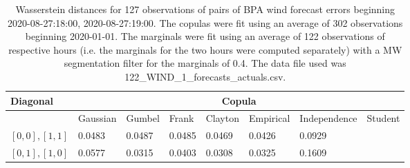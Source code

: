 \begin{table}[h] 
    \centering 
    \begin{tabular}{|l|l|l|l|l|l|l|l|} \hline 
        \textbf{Diagonal} & \multicolumn{7}{c|}{\textbf{Copula}} \\ \hline 
        & Gaussian & Gumbel & Frank & Clayton & Empirical & Independence & Student \\ \hline 
        $[0,0], [1,1]$ & 0.0483 & 0.0487 & 0.0485 & 0.0469 & 0.0426 & 0.0929 &  \\ \hline 
        $[0,1], [1,0]$ & 0.0577 & 0.0315 & 0.0403 & 0.0308 & 0.0325 & 0.1609 &  \\ \hline 
    \end{tabular} 
    \caption{Wasserstein distances for 127 observations of pairs of BPA wind forecast errors beginning 2020-08-27:18:00, 2020-08-27:19:00. The copulas were fit  using an average of 302 observations beginning 2020-01-01. The marginals were fit using an average of 122 observations of respective hours (i.e. the  marginals for the two hours were computed separately) with a MW segmentation filter for the marginals of 0.4. The data file used was 122\_WIND\_1\_forecasts\_actuals.csv.} 
\end{table}